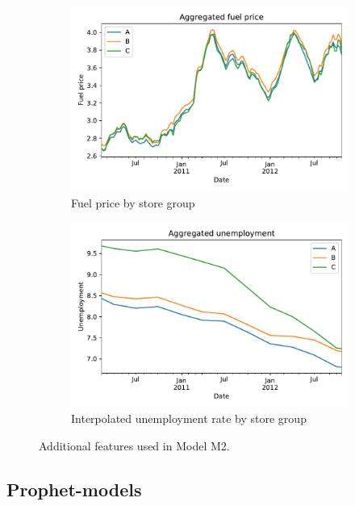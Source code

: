 \documentclass[english, 12pt, a4paper, sci, utf8, a-1b, online]{aaltothesis}
\begin{document}
\begin{abstractpage}[english]
\begin{figure}[htb]
\begin{subfigure}[b]{0.5\textwidth}
		\includegraphics[width=\textwidth]{../plots/dataset/dataset_plot_fuel_price.pdf}
		\caption{Fuel price by store group}
		\label{fig:data_fuel}
	\end{subfigure}
	\hfill
	\begin{subfigure}[b]{0.5\textwidth}
		\centering
		\includegraphics[width=\textwidth]{../plots/dataset/dataset_plot_unemployment_interpolated.pdf}
		\caption{Interpolated unemployment rate by store group}
		\label{fig:data_unemp}
	\end{subfigure}
	\caption{\label{fig:regressors} Additional features used in Model M2.}
\end{figure}


\subsection{Prophet-models}


\end{abstractpage}
\end{document}
